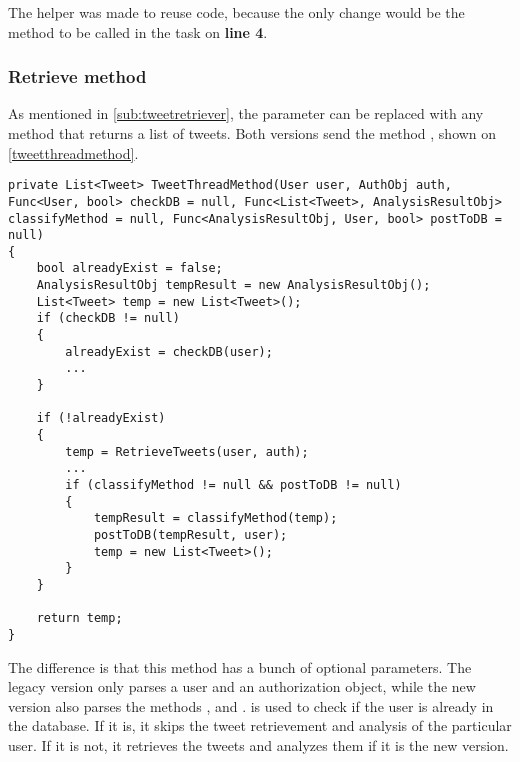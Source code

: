 The helper was made to reuse code, because the only change would be the method
to be called in the task on \textbf{line 4}.\\

\subsubsection{Retrieve method}
As mentioned in \autoref{sub:tweetretriever}, the 
parameter can be replaced with any method that returns a list of tweets. Both
versions send the method , shown on
\autoref{tweetthreadmethod}. \\

\begin{minipage}[H]{\linewidth}
\begin{lstlisting}[caption = The TweetThreadMethod function, label =
tweetthreadmethod]
private List<Tweet> TweetThreadMethod(User user, AuthObj auth, Func<User, bool> checkDB = null, Func<List<Tweet>, AnalysisResultObj> classifyMethod = null, Func<AnalysisResultObj, User, bool> postToDB = null)
{
    bool alreadyExist = false;
    AnalysisResultObj tempResult = new AnalysisResultObj();
    List<Tweet> temp = new List<Tweet>();
    if (checkDB != null)
    {
        alreadyExist = checkDB(user);
		...
    }

    if (!alreadyExist)
    {
        temp = RetrieveTweets(user, auth);
		...	
        if (classifyMethod != null && postToDB != null)
        {
            tempResult = classifyMethod(temp); 
            postToDB(tempResult, user); 
            temp = new List<Tweet>();
        }
    }

    return temp;
}
\end{lstlisting}

\end{minipage}
The difference is that this method has a bunch of optional parameters. The
legacy version only parses a user and an authorization object, while the new
version also parses the methods ,  and
.
 is used to check if the user is already in the database. If it
is, it skips the tweet retrievement and analysis of the particular user. If it
is not, it retrieves the tweets and analyzes them if it is the new version.\\

